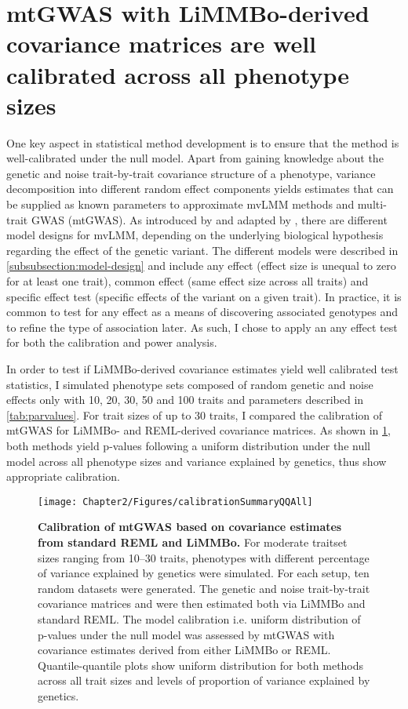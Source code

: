 \section{mtGWAS with LiMMBo-derived covariance matrices are well calibrated across all phenotype sizes}
\label{section:calibration-limmbo}
One key aspect in statistical method development is to ensure that the method is well-calibrated under the null model. Apart from gaining knowledge about the genetic and noise trait-by-trait covariance structure of a phenotype, variance decomposition into different random effect components yields estimates that can be supplied as known parameters to approximate mvLMM methods and multi-trait GWAS (mtGWAS). As introduced by \citet{Jiang1995} and adapted by \citet{Korte2012}, there are different model designs for mvLMM, depending on the underlying biological hypothesis regarding the effect of the genetic variant. The different models were described in \cref{subsubsection:model-design} and include any effect (effect size is unequal to zero for at least one trait), common effect (same effect size across all traits) and specific effect test (specific effects of the variant on a given trait). In practice, it is common to test for any effect as a means of discovering associated genotypes and to refine the type of association later. As such, I chose to apply an any effect test for both the calibration and power analysis.

In order to test if LiMMBo-derived covariance estimates yield well calibrated test statistics, I simulated phenotype sets composed of random genetic and noise effects only with \num{10}, \num{20}, \num{30}, \num{50} and \num{100} traits and parameters described in \cref{tab:parvalues}. For trait sizes of up to \num{30} traits, I compared the calibration of mtGWAS for LiMMBo- and REML-derived covariance matrices. As shown in \cref{fig:calibration}, both methods yield p-values following a uniform distribution under the null model across all phenotype sizes and variance explained by genetics, thus show appropriate calibration. 
%
\begin{figure}[h!]
	\centering	
	\texttt{[image: Chapter2/Figures/calibrationSummaryQQAll]}\\
	\caption[\textbf{Calibration of mtGWAS based on covariance estimates from standard REML and LiMMBo.}]{\textbf{Calibration of mtGWAS based on covariance estimates from standard REML and LiMMBo.} For moderate traitset sizes ranging from \numrange{10}{30} traits, phenotypes with different percentage of variance explained by genetics were simulated. For each setup, ten random datasets were generated. The genetic and noise trait-by-trait covariance matrices  and  were then estimated both via LiMMBo and standard REML. The model calibration i.e. uniform distribution of p-values under the null model was assessed by mtGWAS with covariance estimates derived from either LiMMBo or REML. Quantile-quantile plots show uniform distribution for both methods across all trait sizes and levels of proportion of variance explained by genetics.}
	  \label{fig:calibration}%
	  \vspace{-2mm}
\end{figure}
%

